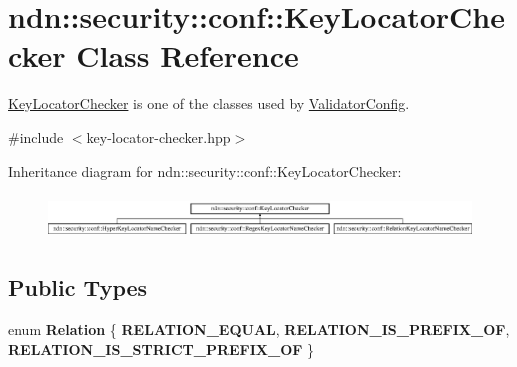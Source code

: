 \hypertarget{classndn_1_1security_1_1conf_1_1KeyLocatorChecker}{}\section{ndn\+:\+:security\+:\+:conf\+:\+:Key\+Locator\+Checker Class Reference}
\label{classndn_1_1security_1_1conf_1_1KeyLocatorChecker}


\hyperlink{classndn_1_1security_1_1conf_1_1KeyLocatorChecker}{Key\+Locator\+Checker} is one of the classes used by \hyperlink{classndn_1_1ValidatorConfig}{Validator\+Config}.  




{\ttfamily \#include $<$key-\/locator-\/checker.\+hpp$>$}

Inheritance diagram for ndn\+:\+:security\+:\+:conf\+:\+:Key\+Locator\+Checker\+:\begin{figure}[H]
\begin{center}
\leavevmode
\includegraphics[height=1.170324cm]{classndn_1_1security_1_1conf_1_1KeyLocatorChecker}
\end{center}
\end{figure}
\subsection*{Public Types}
\begin{DoxyCompactItemize}
\item 
enum {\bfseries Relation} \{ {\bfseries R\+E\+L\+A\+T\+I\+O\+N\+\_\+\+E\+Q\+U\+AL}, 
{\bfseries R\+E\+L\+A\+T\+I\+O\+N\+\_\+\+I\+S\+\_\+\+P\+R\+E\+F\+I\+X\+\_\+\+OF}, 
{\bfseries R\+E\+L\+A\+T\+I\+O\+N\+\_\+\+I\+S\+\_\+\+S\+T\+R\+I\+C\+T\+\_\+\+P\+R\+E\+F\+I\+X\+\_\+\+OF}
 \}\hypertarget{classndn_1_1security_1_1conf_1_1KeyLocatorChecker_ae68dd51e9bb9305e09c7f44db209f5d7}{}\label{classndn_1_1security_1_1conf_1_1KeyLocatorChecker_ae68dd51e9bb9305e09c7f44db209f5d7}

\end{DoxyCompactItemize}

